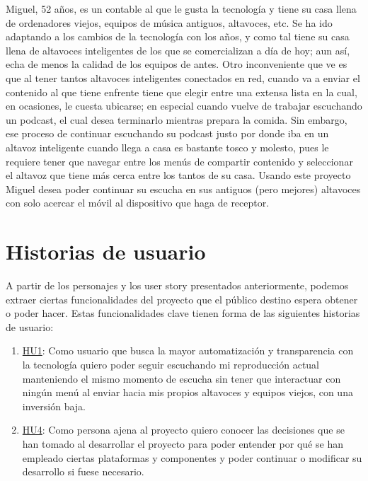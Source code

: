     Miguel, 52 años, es un contable al que le gusta la tecnología y tiene
    su casa llena de ordenadores viejos, equipos de música antiguos, altavoces,
    etc. Se ha ido adaptando a los cambios de la tecnología con los años, y como
    tal tiene su casa llena de altavoces inteligentes de los que se
    comercializan a día de hoy; aun así, echa de menos la calidad de los equipos
    de antes. Otro inconveniente que ve es que al tener tantos altavoces
    inteligentes conectados en red, cuando va a enviar el contenido al que tiene
    enfrente tiene que elegir entre una extensa lista en la cual, en ocasiones,
    le cuesta ubicarse; en especial cuando vuelve de trabajar escuchando un
    podcast, el cual desea terminarlo mientras prepara la comida. Sin embargo,
    ese proceso de continuar escuchando su podcast justo por donde iba en un
    altavoz inteligente cuando llega a casa es bastante tosco y molesto, pues le
    requiere tener que navegar entre los menús de compartir contenido y
    seleccionar el altavoz que tiene más cerca entre los tantos de su casa.
    Usando este proyecto Miguel desea poder continuar su escucha en sus antiguos
    (pero mejores) altavoces con solo acercar el móvil al dispositivo que haga
    de receptor.



\section{Historias de usuario}
A partir de los personajes y los user story presentados anteriormente, podemos
extraer ciertas funcionalidades del proyecto que el público destino espera
obtener o poder hacer. Estas funcionalidades clave tienen forma de las
siguientes historias de usuario:

\begin{enumerate}
    \item
    \href{https://github.com/migueorg/One-touch-music-streaming-TFG-ETSIIT/issues/10}{HU1}:
    Como usuario que busca la mayor automatización y transparencia con la
    tecnología quiero poder seguir escuchando mi reproducción actual manteniendo
    el mismo momento de escucha sin tener que interactuar con ningún menú al
    enviar hacia mis propios altavoces y equipos viejos, con una inversión baja.
    \item
    \href{https://github.com/migueorg/One-touch-music-streaming-TFG-ETSIIT/issues/14}{HU4}:
    Como persona ajena al proyecto quiero conocer las decisiones que se han
    tomado al desarrollar el proyecto para poder entender por qué se han
    empleado ciertas plataformas y componentes y poder continuar o modificar su
    desarrollo si fuese necesario.
\end{enumerate}


